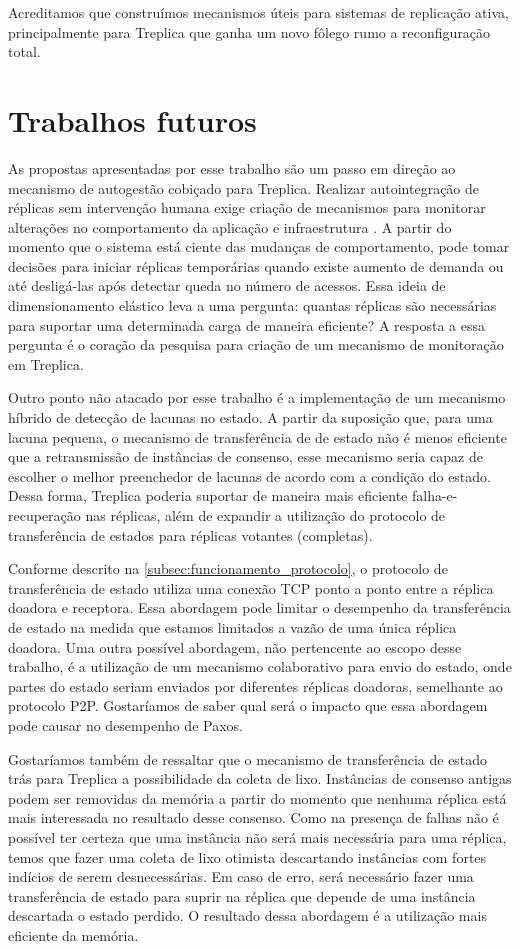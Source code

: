 Acreditamos que construímos mecanismos úteis para sistemas de replicação ativa,
principalmente para Treplica que ganha um novo fôlego rumo a reconfiguração total.


\section*{Trabalhos futuros}

As propostas apresentadas por esse trabalho são um passo em direção ao mecanismo de
autogestão cobiçado para Treplica. Realizar autointegração de réplicas sem intervenção
humana exige criação de mecanismos para monitorar alterações no comportamento da aplicação
e infraestrutura \cite{renesse03, pierre06}. A partir do momento que o sistema está ciente
das mudanças de comportamento, pode tomar decisões para iniciar réplicas temporárias
quando existe aumento de demanda ou até desligá-las após detectar queda no número de
acessos. Essa ideia de dimensionamento elástico leva a uma pergunta: quantas réplicas são
necessárias para suportar uma determinada carga de maneira eficiente? A resposta a essa
pergunta é o coração da pesquisa para criação de um mecanismo de monitoração em Treplica.

Outro ponto não atacado por esse trabalho é a implementação de um mecanismo híbrido de
detecção de lacunas no estado. A partir da suposição que, para uma lacuna pequena, o
mecanismo de transferência de de estado não é menos eficiente que a retransmissão de
instâncias de consenso, esse mecanismo seria capaz de escolher o melhor preenchedor de
lacunas de acordo com a condição do estado. Dessa forma, Treplica poderia suportar de
maneira mais eficiente falha-e-recuperação nas réplicas, além de expandir a utilização do
protocolo de transferência de estados para réplicas votantes (completas).

Conforme descrito na \autoref{subsec:funcionamento_protocolo}, o protocolo de
transferência de estado utiliza uma conexão TCP ponto a ponto entre a réplica doadora e
receptora. Essa abordagem pode limitar o desempenho da transferência de estado na medida
que estamos limitados a vazão de uma única réplica doadora. Uma outra possível abordagem,
não pertencente ao escopo desse trabalho, é a utilização de um mecanismo colaborativo para
envio do estado, onde partes do estado seriam enviados por diferentes réplicas doadoras,
semelhante ao protocolo P2P. Gostaríamos de saber qual será o impacto que essa abordagem
pode causar no desempenho de Paxos.

Gostaríamos também de ressaltar que o mecanismo de transferência de estado trás para
Treplica a possibilidade da coleta de lixo. Instâncias de consenso antigas podem ser
removidas da memória a partir do momento que nenhuma réplica está mais interessada no
resultado desse consenso. Como na presença de falhas não é possível ter certeza que uma
instância não será mais necessária para uma réplica, temos que fazer uma coleta de lixo
otimista descartando instâncias com fortes indícios de serem desnecessárias. Em caso de
erro, será necessário fazer uma transferência de estado para suprir na réplica que depende
de uma instância descartada o estado perdido. O resultado dessa abordagem é a utilização
mais eficiente da memória.

